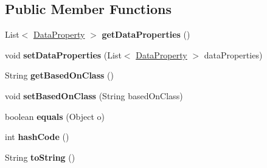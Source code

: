 \subsection*{Public Member Functions}
\begin{DoxyCompactItemize}
\item 
\mbox{\label{classeu_1_1h2020_1_1symbiote_1_1model_1_1cim_1_1ComplexDatatype_a9ea3250cbdd007c769209edca7016821}} 
List$<$ \hyperlink{classeu_1_1h2020_1_1symbiote_1_1model_1_1cim_1_1DataProperty}{Data\+Property} $>$ {\bfseries get\+Data\+Properties} ()
\item 
\mbox{\label{classeu_1_1h2020_1_1symbiote_1_1model_1_1cim_1_1ComplexDatatype_a75f861db4b35f727302c9b1f63cb10a9}} 
void {\bfseries set\+Data\+Properties} (List$<$ \hyperlink{classeu_1_1h2020_1_1symbiote_1_1model_1_1cim_1_1DataProperty}{Data\+Property} $>$ data\+Properties)
\item 
\mbox{\label{classeu_1_1h2020_1_1symbiote_1_1model_1_1cim_1_1ComplexDatatype_a13d7981e9148a1b279efa09f29efae57}} 
String {\bfseries get\+Based\+On\+Class} ()
\item 
\mbox{\label{classeu_1_1h2020_1_1symbiote_1_1model_1_1cim_1_1ComplexDatatype_abf1ccfca451818c407f015c3fc754954}} 
void {\bfseries set\+Based\+On\+Class} (String based\+On\+Class)
\item 
\mbox{\label{classeu_1_1h2020_1_1symbiote_1_1model_1_1cim_1_1ComplexDatatype_aa808580adc4392d2938ec0b3b21d6ac0}} 
boolean {\bfseries equals} (Object o)
\item 
\mbox{\label{classeu_1_1h2020_1_1symbiote_1_1model_1_1cim_1_1ComplexDatatype_ac476191ee4c1abfc0d40c8ac755f570c}} 
int {\bfseries hash\+Code} ()
\item 
\mbox{\label{classeu_1_1h2020_1_1symbiote_1_1model_1_1cim_1_1ComplexDatatype_a9c1f3484366c2b9913ec9e8578e488c9}} 
String {\bfseries to\+String} ()
\end{DoxyCompactItemize}


